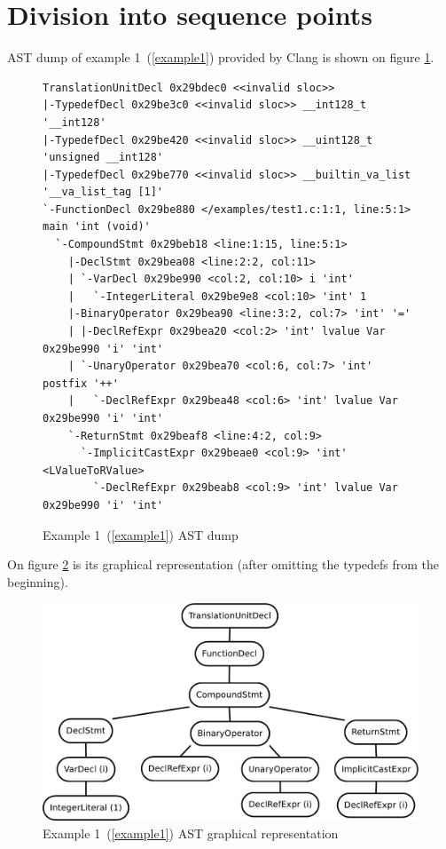 \section{Division into sequence points}
AST dump of example 1~(\ref{example1}) provided by Clang is shown on figure \ref{ASTdump}.
\begin{figure}
\caption{Example 1~(\ref{example1}) AST dump}
\label{ASTdump}
\begin{lstlisting}
TranslationUnitDecl 0x29bdec0 <<invalid sloc>>
|-TypedefDecl 0x29be3c0 <<invalid sloc>> __int128_t '__int128'
|-TypedefDecl 0x29be420 <<invalid sloc>> __uint128_t 'unsigned __int128'
|-TypedefDecl 0x29be770 <<invalid sloc>> __builtin_va_list '__va_list_tag [1]'
`-FunctionDecl 0x29be880 </examples/test1.c:1:1, line:5:1> main 'int (void)'
  `-CompoundStmt 0x29beb18 <line:1:15, line:5:1>
    |-DeclStmt 0x29bea08 <line:2:2, col:11>
    | `-VarDecl 0x29be990 <col:2, col:10> i 'int'
    |   `-IntegerLiteral 0x29be9e8 <col:10> 'int' 1
    |-BinaryOperator 0x29bea90 <line:3:2, col:7> 'int' '='
    | |-DeclRefExpr 0x29bea20 <col:2> 'int' lvalue Var 0x29be990 'i' 'int'
    | `-UnaryOperator 0x29bea70 <col:6, col:7> 'int' postfix '++'
    |   `-DeclRefExpr 0x29bea48 <col:6> 'int' lvalue Var 0x29be990 'i' 'int'
    `-ReturnStmt 0x29beaf8 <line:4:2, col:9>
      `-ImplicitCastExpr 0x29beae0 <col:9> 'int' <LValueToRValue>
        `-DeclRefExpr 0x29beab8 <col:9> 'int' lvalue Var 0x29be990 'i' 'int'
\end{lstlisting}
\end{figure}
On figure \ref{ASTuntagged} is its graphical representation (after omitting the typedefs from the beginning).
\begin{figure}
    \caption{Example 1~(\ref{example1}) AST graphical representation}
    \label{ASTuntagged}
    \centering
        \includegraphics[width=1\textwidth]{fig/example1G.pdf}
\end{figure}

